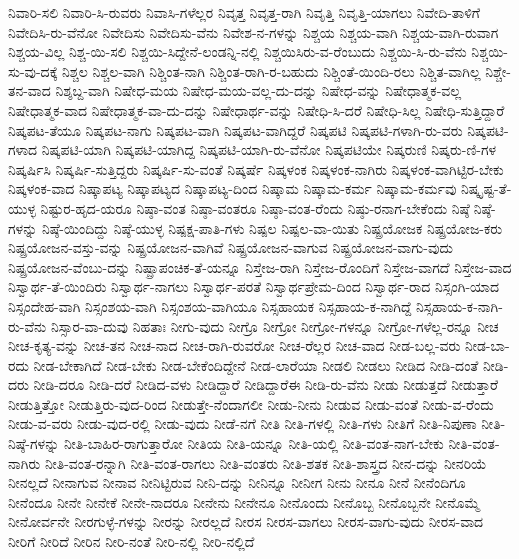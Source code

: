 {ನಿವಾರಿ-ಸಲಿ
ನಿವಾರಿ-ಸಿ-ರುವರು
ನಿವಾಸಿ-ಗಳೆಲ್ಲರ
ನಿವೃತ್ತ
ನಿವೃತ್ತ-ರಾಗಿ
ನಿವೃತ್ತಿ
ನಿವೃತ್ತಿ-ಯಾಗಲು
ನಿವೇದಿ-ತಾಳಿಗೆ
ನಿವೇದಿಸಿ-ರು-ವೆನೋ
ನಿವೇದಿಸು
ನಿವೇದಿಸು-ವೆನು
ನಿವೇಶ-ನ-ಗಳನ್ನು
ನಿಶ್ಚಯ
ನಿಶ್ಚಯ-ವಾಗಿ
ನಿಶ್ಚಯ-ವಾಗಿ-ರುವಾಗ
ನಿಶ್ಚಯ-ವಿಲ್ಲ
ನಿಶ್ಚ-ಯಿ-ಸಲಿ
ನಿಶ್ಚಯಿ-ಸಿದ್ದೇನೆ-ಲಂಡನ್ನಿ-ನಲ್ಲಿ
ನಿಶ್ಚಯಿಸಿರು-ವ-ರೆಂಬುದು
ನಿಶ್ಚಯಿ-ಸಿ-ರು-ವೆನು
ನಿಶ್ಚಯಿ-ಸು-ವು-ದಕ್ಕೆ
ನಿಶ್ಚಲ
ನಿಶ್ಚಲ-ವಾಗಿ
ನಿಶ್ಚಿಂತ-ನಾಗಿ
ನಿಶ್ಚಿಂತ-ರಾಗಿ-ರ-ಬಹುದು
ನಿಶ್ಚಿಂತೆ-ಯಿಂದಿ-ರಲು
ನಿಶ್ಚಿತ-ವಾಗಿಲ್ಲ
ನಿಶ್ಚೇ-ತನ-ವಾದ
ನಿಶ್ಶಬ್ದ-ವಾಗಿ
ನಿಷೇಧ-ಮಯ
ನಿಷೇಧ-ಮಯ-ವಲ್ಲ-ದು-ದನ್ನು
ನಿಷೇಧ-ವನ್ನು
ನಿಷೇಧಾತ್ಮಕ-ವಲ್ಲ
ನಿಷೇಧಾತ್ಮಕ-ವಾದ
ನಿಷೇಧಾತ್ಮಕ-ವಾ-ದು-ದನ್ನು
ನಿಷೇಧಾರ್ಥ-ವನ್ನು
ನಿಷೇಧಿ-ಸಿ-ದರೆ
ನಿಷೇಧಿ-ಸಿಲ್ಲ
ನಿಷೇಧಿ-ಸುತ್ತಿದ್ದಾರೆ
ನಿಷ್ಕಪಟ-ತೆಯೂ
ನಿಷ್ಕಪಟ-ನಾಗು
ನಿಷ್ಕಪಟ-ವಾಗಿ
ನಿಷ್ಕಪಟ-ವಾಗಿದ್ದರೆ
ನಿಷ್ಕಪಟಿ
ನಿಷ್ಕಪಟಿ-ಗಳಾಗಿ-ರು-ವರು
ನಿಷ್ಕಪಟಿ-ಗಳಾದ
ನಿಷ್ಕಪಟಿ-ಯಾಗಿ
ನಿಷ್ಕಪಟಿ-ಯಾಗಿದ್ದ
ನಿಷ್ಕಪಟಿ-ಯಾಗಿ-ರು-ವೆನೋ
ನಿಷ್ಕಪಟಿಯೇ
ನಿಷ್ಕರುಣಿ
ನಿಷ್ಕರು-ಣಿ-ಗಳ
ನಿಷ್ಕರ್ಷಿಸಿ
ನಿಷ್ಕರ್ಷಿ-ಸುತ್ತಿದ್ದರು
ನಿಷ್ಕರ್ಷಿ-ಸು-ವಂತೆ
ನಿಷ್ಕರ್ಷೆ
ನಿಷ್ಕಳಂಕ
ನಿಷ್ಕಳಂಕ-ನಾಗಿರು
ನಿಷ್ಕಳಂಕ-ವಾಗಿಟ್ಟಿರ-ಬೇಕು
ನಿಷ್ಕಳಂಕ-ವಾದ
ನಿಷ್ಕಾಪಟ್ಯ
ನಿಷ್ಕಾಪಟ್ಯದ
ನಿಷ್ಕಾಪಟ್ಯ-ದಿಂದ
ನಿಷ್ಕಾಮ
ನಿಷ್ಕಾಮ-ಕರ್ಮ
ನಿಷ್ಕಾಮ-ಕರ್ಮವು
ನಿಷ್ಕೃಷ್ಟ-ತೆ-ಯುಳ್ಳ
ನಿಷ್ಟುರ-ಹೃದ-ಯರೂ
ನಿಷ್ಠಾ-ವಂತ
ನಿಷ್ಠಾ-ವಂತರೂ
ನಿಷ್ಠಾ-ವಂತ-ರೆಂದು
ನಿಷ್ಠು-ರನಾಗ-ಬೇಕೆಂದು
ನಿಷ್ಠೆ
ನಿಷ್ಠೆ-ಗಳನ್ನು
ನಿಷ್ಠೆ-ಯಿಂದಿದ್ದು
ನಿಷ್ಠೆ-ಯುಳ್ಳ
ನಿಷ್ಪಕ್ಷ-ಪಾತಿ-ಗಳು
ನಿಷ್ಪಲ
ನಿಷ್ಪಲ-ವಾ-ಯಿತು
ನಿಷ್ಪ್ರಯೋಜಕ
ನಿಷ್ಪ್ರಯೋಜ-ಕರು
ನಿಷ್ಪ್ರಯೋಜನ-ವಸ್ತು-ವನ್ನು
ನಿಷ್ಪ್ರಯೋಜನ-ವಾಗಿವೆ
ನಿಷ್ಪ್ರಯೋಜನ-ವಾಗುವ
ನಿಷ್ಪ್ರಯೋಜನ-ವಾಗು-ವುದು
ನಿಷ್ಪ್ರಯೋಜನ-ವೆಂಬು-ದನ್ನು
ನಿಷ್ಪ್ರಾಪಂಚಿಕ-ತೆ-ಯನ್ನೂ
ನಿಸ್ತೇಜ-ರಾಗಿ
ನಿಸ್ತೇಜ-ರೊಂದಿಗೆ
ನಿಸ್ತೇಜ-ವಾಗದೆ
ನಿಸ್ತೇಜ-ವಾದ
ನಿಸ್ವಾರ್ಥ-ತೆ-ಯಿಂದಿರು
ನಿಸ್ವಾರ್ಥ-ನಾಗಲು
ನಿಸ್ವಾರ್ಥ-ಪರತೆ
ನಿಸ್ವಾರ್ಥಪ್ರೇಮ-ದಿಂದ
ನಿಸ್ವಾರ್ಥ-ರಾದ
ನಿಸ್ಸಂಗಿ-ಯಾದ
ನಿಸ್ಸಂದೇಹ-ವಾಗಿ
ನಿಸ್ಸಂಶಯ-ವಾಗಿ
ನಿಸ್ಸಂಶಯ-ವಾಗಿಯೂ
ನಿಸ್ಸಹಾಯಕ
ನಿಸ್ಸಹಾಯ-ಕ-ನಾಗಿದ್ದೆ
ನಿಸ್ಸಹಾಯ-ಕ-ನಾಗಿ-ರು-ವೆನು
ನಿಸ್ಸಾರ-ವಾ-ದುವು
ನಿಹತಾಃ
ನೀಗು-ವುದು
ನೀಗ್ರೊ
ನೀಗ್ರೋ
ನೀಗ್ರೋ-ಗಳನ್ನೂ
ನೀಗ್ರೋ-ಗಳೆಲ್ಲ-ರನ್ನೂ
ನೀಚ
ನೀಚ-ಕೃತ್ಯ-ವನ್ನು
ನೀಚ-ತನ
ನೀಚ-ನಾದ
ನೀಚ-ರಾಗಿ-ರುವರೋ
ನೀಚ-ರೆಲ್ಲರ
ನೀಚ-ವಾದ
ನೀಡ-ಬಲ್ಲ-ವರು
ನೀಡ-ಬಾ-ರದು
ನೀಡ-ಬೇಕಾಗಿದೆ
ನೀಡ-ಬೇಕು
ನೀಡ-ಬೇಕೆಂದಿದ್ದೇನೆ
ನೀಡ-ಲಾರೆಯಾ
ನೀಡಲಿ
ನೀಡಲು
ನೀಡಿದ
ನೀಡಿ-ದಂತೆ
ನೀಡಿ-ದರು
ನೀಡಿ-ದರೂ
ನೀಡಿ-ದರೆ
ನೀಡಿದ-ವಳು
ನೀಡಿದ್ದಾರೆ
ನೀಡಿದ್ದಾರೆಈ
ನೀಡಿ-ರು-ವೆನು
ನೀಡು
ನೀಡುತ್ತದೆ
ನೀಡುತ್ತಾರೆ
ನೀಡುತ್ತಿತ್ತೋ
ನೀಡುತ್ತಿರು-ವುದ-ರಿಂದ
ನೀಡುತ್ತೇ-ನೆಂದಾಗಲೀ
ನೀಡು-ನೀನು
ನೀಡುವ
ನೀಡು-ವಂತೆ
ನೀಡು-ವ-ರೆಂದು
ನೀಡು-ವ-ವರು
ನೀಡು-ವುದ-ರಲ್ಲಿ
ನೀಡು-ವುದು
ನೀಡೆ-ನಗೆ
ನೀತಿ
ನೀತಿ-ಗಳಲ್ಲಿ
ನೀತಿ-ಗಳು
ನೀತಿಗೆ
ನೀತಿ-ನಿಪುಣಾ
ನೀತಿ-ನಿಷ್ಠೆ-ಗಳನ್ನು
ನೀತಿ-ಬಾಹಿರ-ರಾಗುತ್ತಾರೋ
ನೀತಿಯ
ನೀತಿ-ಯನ್ನೂ
ನೀತಿ-ಯಲ್ಲಿ
ನೀತಿ-ವಂತ-ನಾಗ-ಬೇಕು
ನೀತಿ-ವಂತ-ನಾಗಿರು
ನೀತಿ-ವಂತ-ರನ್ನಾಗಿ
ನೀತಿ-ವಂತ-ರಾಗಲು
ನೀತಿ-ವಂತರು
ನೀತಿ-ಶತಕ
ನೀತಿ-ಶಾಸ್ತ್ರದ
ನೀನ-ದನ್ನು
ನೀನರಿಯೆ
ನೀನಲ್ಲದೆ
ನೀನಾಗುವ
ನೀನಾವ
ನೀನಿಟ್ಟಿರುವ
ನೀನಿ-ದನ್ನು
ನೀನಿನ್ನೂ
ನೀನೀಗ
ನೀನು
ನೀನೂ
ನೀನೆ
ನೀನೆಂದಿಗೂ
ನೀನೆಂದೂ
ನೀನೇ
ನೀನೇಕೆ
ನೀನೇ-ನಾದರೂ
ನೀನೇನು
ನೀನೇನೂ
ನೀನೊಂದು
ನೀನೊಬ್ಬ
ನೀನೊಬ್ಬನೇ
ನೀನೊಮ್ಮೆ
ನೀನೋರ್ವನೇ
ನೀರಗುಳ್ಳೆ-ಗಳನ್ನು
ನೀರನ್ನು
ನೀರಲ್ಲದೆ
ನೀರಸ
ನೀರಸ-ವಾಗಲು
ನೀರಸ-ವಾಗು-ವುದು
ನೀರಸ-ವಾದ
ನೀರಿಗೆ
ನೀರಿದೆ
ನೀರಿನ
ನೀರಿ-ನಂತೆ
ನೀರಿ-ನಲ್ಲಿ
ನೀರಿ-ನಲ್ಲಿದೆ
}
